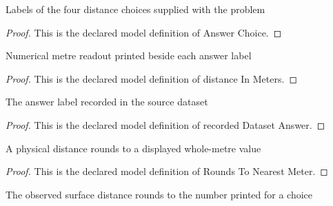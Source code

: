 \begin{definition}
  \label{def:physics:phyx-mini-0632:phyxminiproblems-problemphyxmini0632-answerchoice}
  Labels of the four distance choices supplied with the problem
\end{definition}
\begin{proof}
  This is the declared model definition of Answer Choice.
\end{proof}
\begin{definition}
  \label{def:physics:phyx-mini-0632:phyxminiproblems-problemphyxmini0632-answerchoice-distanceinmeters}
  Numerical metre readout printed beside each answer label
\end{definition}
\begin{proof}
  This is the declared model definition of distance In Meters.
\end{proof}
\begin{definition}
  \label{def:physics:phyx-mini-0632:phyxminiproblems-problemphyxmini0632-recordeddatasetanswer}
  The answer label recorded in the source dataset
\end{definition}
\begin{proof}
  This is the declared model definition of recorded Dataset Answer.
\end{proof}
\begin{definition}
  \label{def:physics:phyx-mini-0632:phyxminiproblems-problemphyxmini0632-roundstonearestmeter}
  A physical distance rounds to a displayed whole-metre value
\end{definition}
\begin{proof}
  This is the declared model definition of Rounds To Nearest Meter.
\end{proof}
\begin{definition}
  \label{def:physics:phyx-mini-0632:phyxminiproblems-problemphyxmini0632-matchesanswerchoice}
  The observed surface distance rounds to the number printed for a choice
\end{definition}
